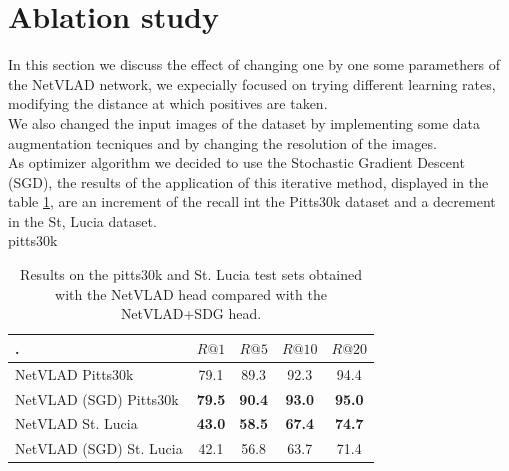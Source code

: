 \documentclass[10pt,twocolumn,letterpaper]{article}
\begin{document}
\section{Ablation study}
In this section we discuss the effect of changing one by one some paramethers of the NetVLAD network, we expecially focused on trying different learning rates, modifying the distance at which positives are taken.\\ We also changed the input images of the dataset by implementing some data augmentation tecniques and by changing the resolution of the images.\\
As optimizer algorithm we decided to use the Stochastic Gradient Descent (SGD), the results of the application of this iterative method, displayed in the table \ref{tab:SGD}, are an increment of the recall int the Pitts30k dataset and a decrement in the St, Lucia dataset.\\
pitts30k
\begin{table}[!h]
	\centering
	\begin{tabular}{|l|c|c|c|c|}
		\hline
		.&        $R@1$   &        $R@5$   &        $R@10$  &        $R@20$   \\ \hline
		NetVLAD  Pitts30k     &         79.1   &         89.3   &          92.3   &          94.4   \\
		NetVLAD (SGD) Pitts30k  &         \textbf{79.5}   &         \textbf{90.4}   &          \textbf{93.0}   &          \textbf{95.0}   \\ \hline
		NetVLAD St. Lucia        &         \textbf{43.0}   &         \textbf{58.5}   &          \textbf{67.4}   &          \textbf{74.7}   \\
		NetVLAD (SGD) St. Lucia      &         42.1   & 56.8  &  63.7  &  71.4  \\
		 \hline
	\end{tabular}
	\caption{Results on the pitts30k and St. Lucia test sets obtained with the NetVLAD head compared with the NetVLAD+SDG head.}
	\label{tab:SGD}
\end{table}
\end{document}
